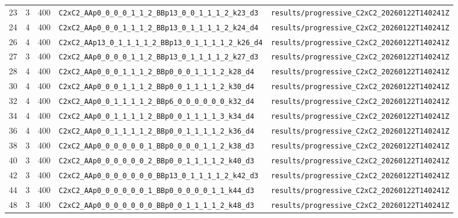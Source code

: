 \documentclass[11pt]{article}
\begin{document}
\begin{longtable}{@{}r r r l l@{}}
23 & 3 & 400 & \texttt{C2xC2\_AAp0\_0\_0\_0\_1\_1\_2\_BBp13\_0\_0\_1\_1\_1\_2\_k23\_d3} & \texttt{results/progressive\_C2xC2\_20260122T140241Z} \\
24 & 4 & 400 & \texttt{C2xC2\_AAp0\_0\_0\_1\_1\_1\_2\_BBp13\_0\_1\_1\_1\_1\_2\_k24\_d4} & \texttt{results/progressive\_C2xC2\_20260122T140241Z} \\
26 & 4 & 400 & \texttt{C2xC2\_AAp13\_0\_1\_1\_1\_1\_2\_BBp13\_0\_1\_1\_1\_1\_2\_k26\_d4} & \texttt{results/progressive\_C2xC2\_20260122T140241Z} \\
27 & 3 & 400 & \texttt{C2xC2\_AAp0\_0\_0\_0\_1\_1\_2\_BBp13\_0\_1\_1\_1\_1\_2\_k27\_d3} & \texttt{results/progressive\_C2xC2\_20260122T140241Z} \\
28 & 4 & 400 & \texttt{C2xC2\_AAp0\_0\_0\_1\_1\_1\_2\_BBp0\_0\_0\_1\_1\_1\_2\_k28\_d4} & \texttt{results/progressive\_C2xC2\_20260122T140241Z} \\
30 & 4 & 400 & \texttt{C2xC2\_AAp0\_0\_0\_1\_1\_1\_2\_BBp0\_0\_1\_1\_1\_1\_2\_k30\_d4} & \texttt{results/progressive\_C2xC2\_20260122T140241Z} \\
32 & 4 & 400 & \texttt{C2xC2\_AAp0\_0\_1\_1\_1\_1\_2\_BBp6\_0\_0\_0\_0\_0\_0\_k32\_d4} & \texttt{results/progressive\_C2xC2\_20260122T140241Z} \\
34 & 4 & 400 & \texttt{C2xC2\_AAp0\_0\_1\_1\_1\_1\_2\_BBp0\_0\_1\_1\_1\_1\_3\_k34\_d4} & \texttt{results/progressive\_C2xC2\_20260122T140241Z} \\
36 & 4 & 400 & \texttt{C2xC2\_AAp0\_0\_1\_1\_1\_1\_2\_BBp0\_0\_1\_1\_1\_1\_2\_k36\_d4} & \texttt{results/progressive\_C2xC2\_20260122T140241Z} \\
38 & 3 & 400 & \texttt{C2xC2\_AAp0\_0\_0\_0\_0\_0\_1\_BBp0\_0\_0\_0\_1\_1\_2\_k38\_d3} & \texttt{results/progressive\_C2xC2\_20260122T140241Z} \\
40 & 3 & 400 & \texttt{C2xC2\_AAp0\_0\_0\_0\_0\_0\_2\_BBp0\_0\_1\_1\_1\_1\_2\_k40\_d3} & \texttt{results/progressive\_C2xC2\_20260122T140241Z} \\
42 & 3 & 400 & \texttt{C2xC2\_AAp0\_0\_0\_0\_0\_0\_0\_BBp13\_0\_1\_1\_1\_1\_2\_k42\_d3} & \texttt{results/progressive\_C2xC2\_20260122T140241Z} \\
44 & 3 & 400 & \texttt{C2xC2\_AAp0\_0\_0\_0\_0\_0\_1\_BBp0\_0\_0\_0\_0\_1\_1\_k44\_d3} & \texttt{results/progressive\_C2xC2\_20260122T140241Z} \\
48 & 3 & 400 & \texttt{C2xC2\_AAp0\_0\_0\_0\_0\_0\_0\_BBp0\_0\_1\_1\_1\_1\_2\_k48\_d3} & \texttt{results/progressive\_C2xC2\_20260122T140241Z} \\

\end{longtable}
\end{document}
